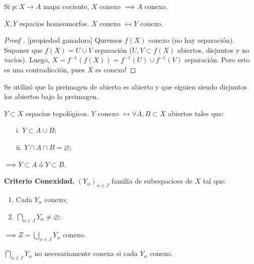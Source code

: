 \begin{corollary}
	Si $p:X \to A$ mapa cociente, $X$ conexo $\implies A$ conexo.
\end{corollary}

\begin{corollary}
	$X,Y$ espacios homeomorfos. $X$ conexo $\longleftrightarrow Y$ conexo.
\end{corollary}

\begin{proof}[Proof ][propiedad ganadora]
	Quremos $f(X)$ conexo (no hay separación). Suponer que $f(X) = U \cup V$ separación ($U,V \subset f(X)$ abiertos, disjuntos y no vacíos). Luego, $X = f^{-1}(f(X)) = f^{-1}(U) \cup f^{-1}(V)$ separación. Pero esto es una contradicción, pues $X$ es conexo!
\end{proof}

\begin{note}
	Se utilizó que la preimagen de abierto es abierto y que siguien siendo disjuntos los abiertos bajo la preimagen.
\end{note}

\begin{lemma}
	$Y \subset X$ espacios topológicos. $Y$ conexo $\longleftrightarrow \forall A,B \subset X$ abiertos tales que:
	\begin{enumerate}
		\item[i.] $Y \subset A \cup B$;

		\item[ii.] $Y \cap A \cap B = \varnothing$;
	\end{enumerate}
	$\implies Y \subset A$ ó $Y \subset B$.
\end{lemma}

\text{}

\noindent \textbf{Criterio Conexidad.} $(Y_{\alpha})_{\alpha \in J}$ familia de subespacioes de $X$ tal que:
\begin{enumerate}
	\item Cada $Y_{\alpha}$ conexo;

	\item $\bigcap_{\alpha \in J} Y_{\alpha} \neq \varnothing$;
\end{enumerate}
$\implies Z = \bigcup_{\alpha \in J} Y_{\alpha}$ conexo.

\begin{observe}
	$\bigcap_{\alpha \in J} Y_{\alpha}$ no necesariamente conexa si cada $Y_{\alpha}$ conexo.
\end{observe}

